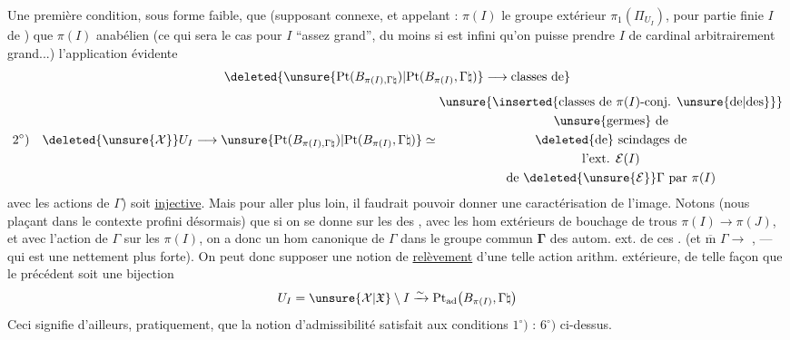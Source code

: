 Une première condition, sous forme faible,  que (supposant  connexe, et appelant : $\pi(I)$ le groupe extérieur $\pi_1(\Pi_{U_I})$, pour  partie finie $I$ de ) que  $\pi(I)$ anabélien (ce qui sera le cas pour $I$ ``assez grand'',
du moins si  est infini  qu'on puisse prendre $I$ de cardinal arbitrairement grand...)  l'application évidente
\[
\deleted{\unsure{\mathrm{Pt}(B_{\pi(I),\Gamma\natural})|\mathrm{Pt}(B_{\pi(I)},\Gamma\natural)}\longrightarrow\text{classes de}}
\]
\[
2^\circ)\quad
\deleted{\unsure{\mathcal X}}U_I\longrightarrow
\unsure{\mathrm{Pt}(B_{\pi(I),\Gamma\natural})|\mathrm{Pt}(B_{\pi(I)},\Gamma\natural)}
\simeq
\begin{gathered}
\unsure{\inserted{\text{classes de }\pi(I)\text{-conj. }\unsure{\text{de}|\text{des}}}}\\
\unsure{\text{germes}}\text{ de}\\
\deleted{\text{de}}\text{ scindages de}\\
\text{l'ext. }\mathcal E(I)\\
\text{de }\deleted{\unsure{\mathcal E}}\Gamma\text{ par }\pi(I)
\end{gathered}
\]
 avec les actions de $\Gamma$) soit \uline{injective}. Mais pour aller plus loin, il faudrait pouvoir donner une caractérisation de l'image. Notons (nous plaçant dans le contexte profini désormais) que si on se donne sur les  des ,  avec les hom extérieurs de bouchage de trous $\pi(I)\longrightarrow\pi(J)$, et avec l'action de $\Gamma$ sur les $\pi(I)$, on a donc un
hom canonique de $\Gamma$ dans le groupe commun  $\boldsymbol{\Gamma}$ des autom.  \unsure{(}ext. de ces .
(et $\overline{\mathrm m}$ $\Gamma\longrightarrow$ , --- qui est  une  nettement plus forte). On peut donc
supposer  une notion de \uline{relèvement}
 d'une telle action arithm.
extérieure, de telle façon que le
 précédent soit une bijection
\[
 U_I=\unsure{\mathcal X|\mathfrak X}\setminus I
 \xrightarrow{\sim}
 \mathrm{Pt}_{\mathrm{ad}}\bigl(B_{\pi(I)},\Gamma\natural\bigr)
\]
Ceci signifie d'ailleurs, pratiquement,
que la notion d'admissibilité satisfait
aux conditions $1^\circ)$ : $6^\circ)$  ci-dessus.

